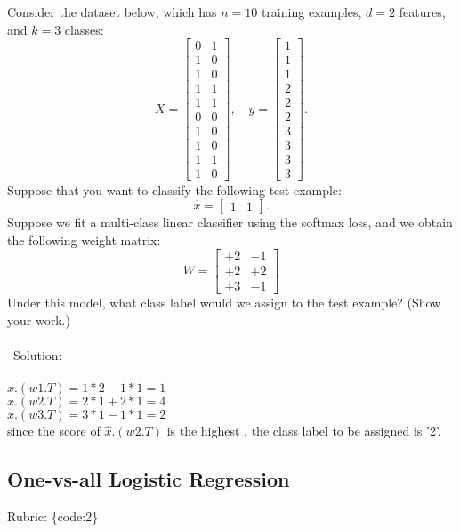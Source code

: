 \documentclass{article}
\def\rubric#1{\gre{Rubric: \{#1\}}}{}
\def\blu#1{{\color{blu}#1}}
\def\gre#1{{\color{gre}#1}}
\begin{document}
Consider the dataset below, which has $n=10$ training examples, $d=2$ features, and $k=3$ classes:
\[
X = \begin{bmatrix}0 & 1\\1 & 0\\ 1 & 0\\ 1 & 1\\ 1 & 1\\ 0 & 0\\  1 & 0\\  1 & 0\\  1 & 1\\  1 &0\end{bmatrix}, \quad y = \begin{bmatrix}1\\1\\1\\2\\2\\2\\3\\3\\3\\3\end{bmatrix}.
\]
Suppose that you want to classify the following test example:
\[
\hat{x} = \begin{bmatrix}1 & 1\end{bmatrix}.
\]
Suppose we fit a multi-class linear classifier using the softmax loss, and we obtain the following weight matrix:
\[
W =
\begin{bmatrix}
+2 & -1\\
+2 & +2\\
+3 & -1
\end{bmatrix}
\]
\blu{Under this model, what class label would we assign to the test example? (Show your work.)} \\ \\\
\blu{Solution: \\ \\
$\hat{x}.(w1.T) = 1*2 - 1 *1 = 1$ \\
$\hat{x}.(w2.T)  = 2*1 + 2 *1 = 4$ \\
$\hat{x}.(w3.T) = 3*1 - 1*1 = 2$ \\
since the score of $\hat{x}.(w2.T)$ is the highest . the class label to be assigned is '2'.
}

\subsection{One-vs-all Logistic Regression}
\rubric{code:2}
\end{document}
